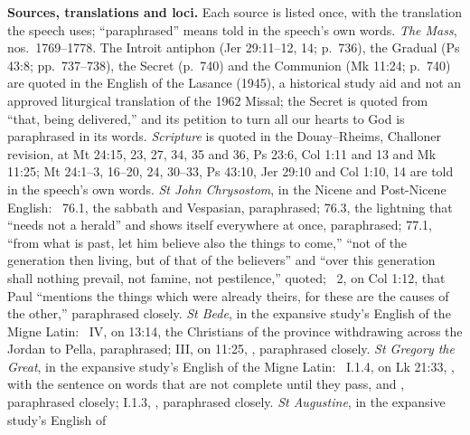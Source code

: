 {\textbf{Sources, translations and loci.} Each source is listed once, with the
translation the speech uses; ``paraphrased'' means told in the speech's own
words. \emph{The Mass}, nos.~1769--1778. The Introit antiphon (Jer
29:11--12, 14; p.~736), the Gradual (Ps 43:8; pp.~737--738), the Secret
(p.~740) and the Communion (Mk 11:24; p.~740) are quoted in the English of
the Lasance  (1945), a historical study aid and not
an approved liturgical translation of the 1962 Missal; the Secret is quoted
from ``that, being delivered,'' and its petition to turn all our hearts to God
is paraphrased in its words.
\emph{Scripture} is quoted in the Douay--Rheims, Challoner revision, at Mt
24:15, 23, 27, 34, 35 and 36, Ps 23:6, Col 1:11 and 13 and Mk 11:25; Mt
24:1--3, 16--20, 24, 30--33, Ps 43:10, Jer 29:10 and Col 1:10, 14 are told in
the speech's own words. \emph{St John Chrysostom}, in the Nicene and Post-Nicene
English: ~76.1, the sabbath and Vespasian, paraphrased;
76.3, the lightning that ``needs not a herald'' and shows itself everywhere
at once, paraphrased; 77.1, ``from what is past, let him believe also the
things to come,'' ``not of the generation then living, but of that of the
believers'' and ``over this generation shall nothing prevail, not famine, not
pestilence,'' quoted; ~2, on Col 1:12, that Paul
``mentions the things which were already theirs, for these are the causes of
the other,'' paraphrased closely. \emph{St Bede}, in the expansive study's
English of the Migne Latin: ~IV, on
13:14, the Christians of the province  withdrawing
across the Jordan to Pella, paraphrased; III, on 11:25, , paraphrased closely. \emph{St
Gregory the Great}, in the expansive study's English of the Migne Latin:
~I.1.4, on Lk 21:33, , with the sentence on words that are not
complete until they pass, and , paraphrased closely; I.1.3, ,
paraphrased closely. \emph{St Augustine}, in the expansive study's English of
}
